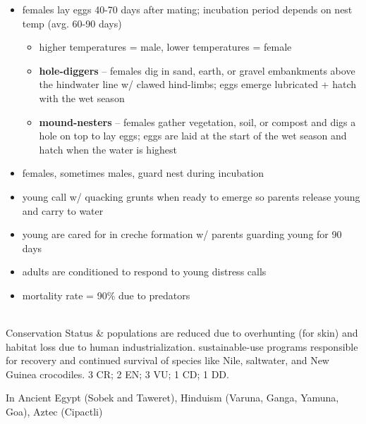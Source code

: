 \begin{center}
\begin{longtabu}
\begin{itemize}[noitemsep]
		\item females lay eggs 40-70 days after mating; incubation period depends on nest temp (avg. 60-90 days)
			\begin{itemize}[noitemsep]
			\item higher temperatures = male, lower temperatures = female
			\item \textbf{hole-diggers} -- females dig in sand, earth, or gravel embankments above the hindwater line w/ clawed hind-limbs; eggs emerge lubricated + hatch with the wet season
			\item \textbf{mound-nesters} -- females gather vegetation, soil, or compost  and digs a hole on top to lay eggs; eggs are laid at the start of the wet season and hatch when the water is highest
			\end{itemize}
		\item females, sometimes males, guard nest during incubation
		\item young call w/ quacking grunts when ready to emerge so parents release young and carry to water
		\item young are cared for in creche formation w/ parents guarding young for 90 days
		\item adults are conditioned to respond to young distress calls
		\item mortality rate = 90\% due to predators
	\end{itemize}
	\\
	\hline
	Conservation Status &
	populations are reduced due to overhunting (for skin) and habitat loss due to human industrialization. sustainable-use programs responsible for recovery and continued survival of species like Nile, saltwater, and New Guinea crocodiles. 3 CR; 2 EN; 3 VU; 1 CD; 1 DD. 
	
	In Ancient Egypt (Sobek and Taweret), Hinduism (Varuna, Ganga, Yamuna, Goa), Aztec (Cipactli)
	 \\
	\hline 
\end{longtabu}
\end{center}